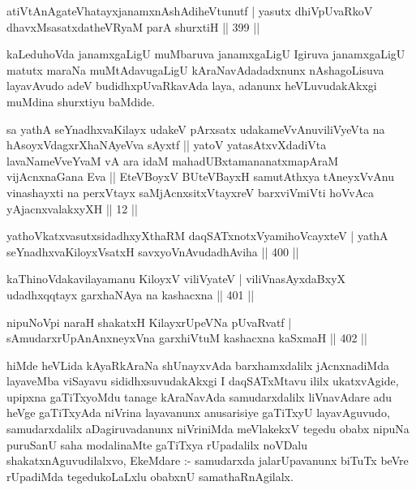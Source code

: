 
\begin{shl}
atiVtAnAgateVhatayxjanamxnAshAdiheVtunutf |
yasutx dhiVpUvaRkoV dhavxMsasatxdatheVRyaM parA shurxtiH \hfill || 399 ||
\end{shl}

\begin{artha}
kaLeduhoVda janamxgaLigU muMbaruva janamxgaLigU Igiruva janamxgaLigU matutx maraNa muMtAdavugaLigU kAraNavAdadadxnunx nAshagoLisuva layavAvudo adeV budidhxpUvaRkavAda laya, adanunx heVLuvudakAkxgi muMdina shurxtiyu baMdide.
\end{artha}


\begin{kandikeshl}
sa yathA seYnadhxvaKilayx udakeV pArxsatx udakameVvAnuviliVyeVta na hAsoyxVdagxrXhaNAyeVva sAyxtf || yatoV yatasAtxvXdadiVta lavaNameVveYvaM vA ara idaM mahadUBxtamananatxmapAraM vijAcnxnaGana Eva || EteVBoyxV BUteVBayxH samutAthxya tAneyxVvAnu vinashayxti na perxVtayx saMjAcnxsitxVtayxreV barxviVmiVti hoVvAca yAjacnxvalakxyXH || 12 ||
\end{kandikeshl}

\begin{shl}
yathoVkatxvasutxsidadhxyXthaRM daqSATxnotxV\s yamihoVcayxteV |
yathA seYnadhxvaKiloyxV\s satxH savxyoVnAvudadhAviha \hfill || 400 ||
\end{shl}

\begin{shl}
kaThinoVdakavilayamanu KiloyxV viliVyateV |
viliVnasAyxdaBxyX udadhxqqtayx garxhaNAya na kashacxna \hfill || 401 ||
\end{shl}

\begin{shl}
nipuNoV\s pi naraH shakatxH KilayxrUpeVNa pUvaRvatf |
sAmudarxrUpAnAnxneyxVna garxhiVtuM kashacxna kaSxmaH \hfill || 402 ||
\end{shl}

\begin{artha}
hiMde heVLida kAyaRkAraNa shUnayxvAda barxhamxdalilx jAcnxnadiMda layaveMba viSayavu sididhxsuvudakAkxgi I daqSATxMtavu ililx ukatxvAgide, upipxna gaTiTxyoMdu tanage kAraNavAda samudarxdalilx liVnavAdare adu heVge gaTiTxyAda niVrina layavanunx anusarisiye gaTiTxyU layavAguvudo, samudarxdalilx aDagiruvadanunx niVriniMda meVlakekxV tegedu obabx nipuNa puruSanU saha modalinaMte gaTiTxya rUpadalilx noVDalu shakatxnAguvudilalxvo, EkeMdare :- samudarxda jalarUpavanunx biTuTx beVre rUpadiMda tegedukoLaLxlu obabxnU samathaRnAgilalx.
\end{artha}

